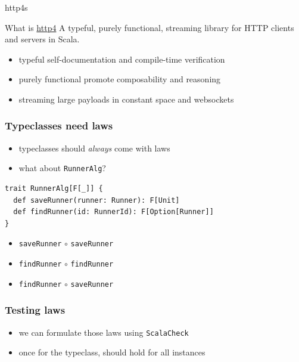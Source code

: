 \documentclass{beamer}
\begin{document}
\begin{frame}{http4s}
  \begin{block}{What is \hyperlink{http://http4s.org/}{http4}}
    A typeful, purely functional, streaming library for HTTP
    clients and servers in Scala.
  \end{block}
  \begin{itemize}
  \item typeful \textemdash{} self-documentation and compile-time verification
  \item purely functional \textemdash{} promote composability and reasoning
  \item streaming \textemdash{} large payloads in constant space and websockets
  \end{itemize}
\end{frame}

\begin{frame}[fragile]
  \frametitle{Typeclasses need laws}
  \begin{itemize}
  \item<1-> typeclasses should \textit{always} come with laws
  \item<1-> what about \texttt{RunnerAlg}?
  \end{itemize}
\begin{verbatim}
trait RunnerAlg[F[_]] {
  def saveRunner(runner: Runner): F[Unit]
  def findRunner(id: RunnerId): F[Option[Runner]]
}
\end{verbatim}
  \begin{itemize}
  \item<2-> \texttt{saveRunner} $\circ{}$ \texttt{saveRunner}
  \item<2-> \texttt{findRunner} $\circ{}$ \texttt{findRunner}
  \item<2-> \texttt{findRunner} $\circ{}$ \texttt{saveRunner}
  \end{itemize}
\end{frame}

\begin{frame}
  \frametitle{Testing laws}
  \begin{itemize}
  \item we can formulate those laws using \texttt{ScalaCheck}
  \item once for the typeclass, should hold for all instances
  \end{itemize}
\end{frame}
\end{document}
